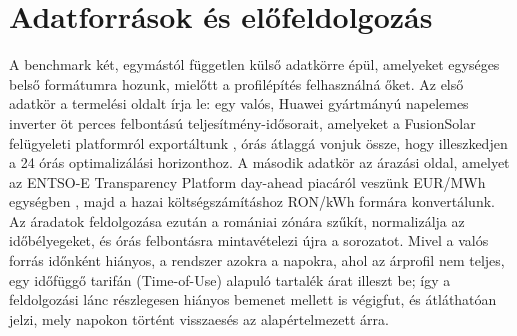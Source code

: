 \section{Adatforrások és előfeldolgozás}
A benchmark két, egymástól független külső adatkörre épül, amelyeket egységes belső formátumra hozunk, mielőtt a profilépítés felhasználná őket. Az első adatkör a termelési oldalt írja le: egy valós, Huawei gyártmányú napelemes inverter öt perces felbontású teljesítmény-idősorait, amelyeket a FusionSolar felügyeleti platformról exportáltunk \cite{HuaweiFusionSolar}, órás átlaggá vonjuk össze, hogy illeszkedjen a 24 órás optimalizálási horizonthoz. A második adatkör az árazási oldal, amelyet az ENTSO-E Transparency Platform day-ahead piacáról veszünk EUR/MWh egységben \cite{ENTSOE}, majd a hazai költségszámításhoz RON/kWh formára konvertálunk. Az áradatok feldolgozása ezután a romániai zónára szűkít, normalizálja az időbélyegeket, és órás felbontásra mintavételezi újra a sorozatot. Mivel a valós forrás időnként hiányos, a rendszer azokra a napokra, ahol az árprofil nem teljes, egy időfüggő tarifán (Time-of-Use) alapuló tartalék árat illeszt be; így a feldolgozási lánc részlegesen hiányos bemenet mellett is végigfut, és átláthatóan jelzi, mely napokon történt visszaesés az alapértelmezett árra.

